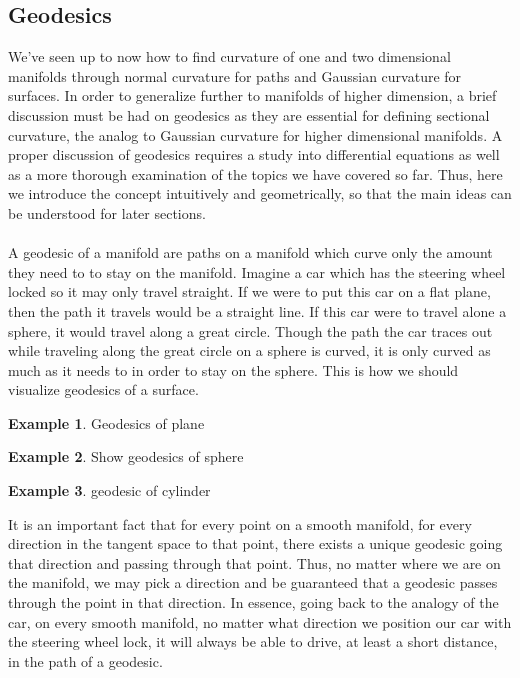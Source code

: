 \documentclass[]{article}
\newcommand\<{\ensuremath{\left\langle}}
\renewcommand\>{\ensuremath{\right\rangle}}
\theoremstyle{definition}
\theoremstyle{definition}
\newtheorem{example}{Example}[section]
\begin{document}
	\subsection*{Geodesics}
	We've seen up to now how to find curvature of one and two dimensional manifolds through normal curvature for paths and Gaussian curvature for surfaces. In order to generalize further to manifolds of higher dimension, a brief discussion must be had on geodesics as they are essential for defining sectional curvature, the analog to Gaussian curvature for higher dimensional manifolds. A proper discussion of geodesics requires a study into differential equations as well as a more thorough examination of the topics we have covered so far. Thus, here we introduce the concept intuitively and geometrically, so that the main ideas can be understood for later sections.\\
	\\
	A geodesic of a manifold are paths on a manifold which curve only the amount they need to to stay on the manifold. Imagine a car which has the steering wheel locked so it may only travel straight. If we were to put this car on a flat plane, then the path it travels would be a straight line. If this car were to travel alone a sphere, it would travel along a great circle. Though the path the car traces out while traveling along the great circle on a sphere is curved, it is only curved as much as it needs to in order to stay on the sphere. This is how we should visualize geodesics of a surface.
	\begin{example}
		Geodesics of plane
	\end{example}
	\begin{example}
		Show geodesics of sphere
	\end{example}
	\begin{example}
		geodesic of cylinder
	\end{example}
		
	It is an important fact that for every point on a smooth manifold, for every direction in the tangent space to that point, there exists a unique geodesic going that direction and passing through that point. Thus, no matter where we are on the manifold, we may pick a direction and be guaranteed that a geodesic passes through the point in that direction. In essence, going back to the analogy of the car, on every smooth manifold, no matter what direction we position our car with the steering wheel lock, it will always be able to drive, at least a short distance, in the path of a geodesic.
	
\end{document}

